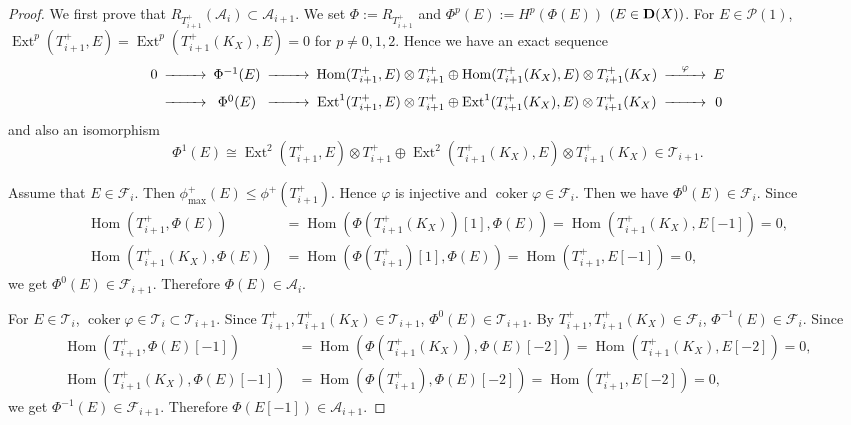 \documentclass[leqno,11pt]{amsart}
\def\Ext{\mathop{\mathrm{Ext}}\nolimits}
\def\Hom{\mathop{\mathrm{Hom}}\nolimits}
\def\coker{\mathop{\mathrm{coker}}\nolimits}
\theoremstyle{definition}
\def\AA{\ensuremath{\mathcal A}}
\def\FF{\ensuremath{\mathcal F}}
\def\PP{\ensuremath{\mathcal P}}
\def\TT{\ensuremath{\mathcal T}}
\begin{document}
\begin{proof}
We first prove that 
$R_{T_{i+1}^+}(\AA_i) \subset \AA_{i+1}$.
We set $\Phi:=R_{T_{i+1}^+}$ and $\Phi^p(E):=H^p(\Phi(E))$ $(E \in {\bf D}(X))$.
For $E \in \PP(1)$, 
$\Ext^p(T_{i+1}^+,E)=\Ext^p(T_{i+1}^+(K_X),E)=0$ for $p \ne 0,1,2$.
Hence we have an exact sequence
\begin{equation}
\begin{CD}
0 @>>> \Phi^{-1}(E) @>>> \Hom(T_{i+1}^+,E) \otimes T_{i+1}^+ \oplus  
\Hom(T_{i+1}^+(K_X),E) \otimes T_{i+1}^+ (K_X) @>{\varphi}>> E \\
 @>>> \Phi^0(E) @>>> \Ext^1(T_{i+1}^+,E) \otimes T_{i+1}^+ \oplus  
\Ext^1(T_{i+1}^+(K_X),E) \otimes T_{i+1}^+ (K_X) @>>> 0
\end{CD}
\end{equation}
and also an isomorphism
\begin{equation}
\Phi^1(E) \cong \Ext^2(T_{i+1}^+,E) \otimes T_{i+1}^+\oplus  
\Ext^2(T_{i+1}^+(K_X),E) \otimes T_{i+1}^+ (K_X) \in \TT_{i+1}.
\end{equation}

Assume that $E \in \FF_i$. Then
$\phi_{\max}^+(E) \leq \phi^+(T_{i+1}^+)$. Hence 
$\varphi$ is injective and $\coker \varphi \in \FF_i$. 
Then we have $\Phi^0(E) \in \FF_i$.
Since 
\begin{equation}
\begin{split}
\Hom(T_{i+1}^+,\Phi(E))& =\Hom(\Phi(T_{i+1}^+(K_X))[1],\Phi(E))
=\Hom(T_{i+1}^+(K_X),E[-1])=0,\\
\Hom(T_{i+1}^+(K_X),\Phi(E))&=\Hom(\Phi(T_{i+1}^+)[1],\Phi(E))
=\Hom(T_{i+1}^+,E[-1])=0,
\end{split}
\end{equation}
we get
$\Phi^0(E) \in \FF_{i+1}$.
Therefore $\Phi(E) \in \AA_i$.

For $E \in \TT_i$, 
$\coker \varphi \in \TT_i \subset \TT_{i+1}$.
Since $T_{i+1}^+, T_{i+1}^+ (K_X)\in \TT_{i+1}$,
$\Phi^0(E) \in \TT_{i+1}$.
By $T_{i+1}^+,T_{i+1}^+(K_X) \in \FF_i$, $\Phi^{-1}(E) \in \FF_i$.
Since 
\begin{equation}
\begin{split}
\Hom(T_{i+1}^+,\Phi(E)[-1])& =\Hom(\Phi(T_{i+1}^+(K_X)),\Phi(E)[-2])
=\Hom(T_{i+1}^+(K_X),E[-2])=0,\\
\Hom(T_{i+1}^+(K_X),\Phi(E)[-1])&=\Hom(\Phi(T_{i+1}^+),\Phi(E)[-2])
=\Hom(T_{i+1}^+,E[-2])=0,
\end{split}
\end{equation}
we get $\Phi^{-1}(E) \in \FF_{i+1}$.
Therefore $\Phi(E[-1]) \in \AA_{i+1}$.



\end{proof}
\end{document}
